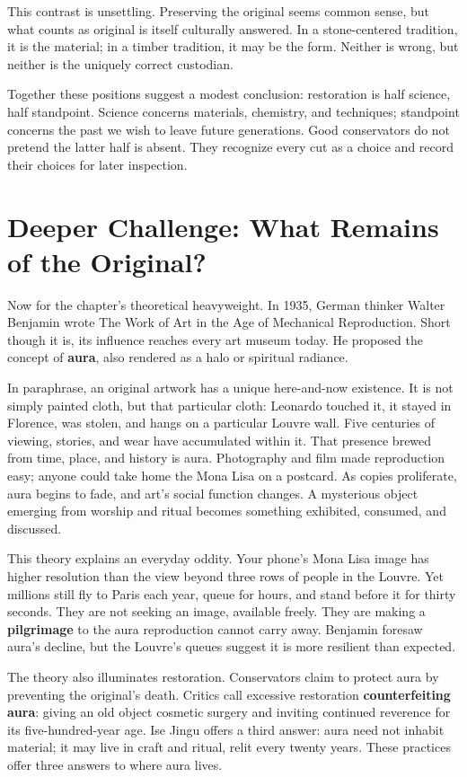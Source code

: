 This contrast is unsettling. Preserving the original seems common sense, but what counts as original is itself culturally answered. In a stone-centered tradition, it is the material; in a timber tradition, it may be the form. Neither is wrong, but neither is the uniquely correct custodian.

Together these positions suggest a modest conclusion: restoration is half science, half standpoint. Science concerns materials, chemistry, and techniques; standpoint concerns the past we wish to leave future generations. Good conservators do not pretend the latter half is absent. They recognize every cut as a choice and record their choices for later inspection.

\section[What Remains of the Original?]{Deeper Challenge: What Remains of the Original?}
Now for the chapter's theoretical heavyweight. In 1935, German thinker Walter Benjamin wrote The Work of Art in the Age of Mechanical Reproduction. Short though it is, its influence reaches every art museum today. He proposed the concept of \textbf{aura}, also rendered as a halo or spiritual radiance.

In paraphrase, an original artwork has a unique here-and-now existence. It is not simply painted cloth, but that particular cloth: Leonardo touched it, it stayed in Florence, was stolen, and hangs on a particular Louvre wall. Five centuries of viewing, stories, and wear have accumulated within it. That presence brewed from time, place, and history is aura. Photography and film made reproduction easy; anyone could take home the Mona Lisa on a postcard. As copies proliferate, aura begins to fade, and art's social function changes. A mysterious object emerging from worship and ritual becomes something exhibited, consumed, and discussed.

This theory explains an everyday oddity. Your phone's Mona Lisa image has higher resolution than the view beyond three rows of people in the Louvre. Yet millions still fly to Paris each year, queue for hours, and stand before it for thirty seconds. They are not seeking an image, available freely. They are making a \textbf{pilgrimage} to the aura reproduction cannot carry away. Benjamin foresaw aura's decline, but the Louvre's queues suggest it is more resilient than expected.

The theory also illuminates restoration. Conservators claim to protect aura by preventing the original's death. Critics call excessive restoration \textbf{counterfeiting aura}: giving an old object cosmetic surgery and inviting continued reverence for its five-hundred-year age. Ise Jingu offers a third answer: aura need not inhabit material; it may live in craft and ritual, relit every twenty years. These practices offer three answers to where aura lives.

